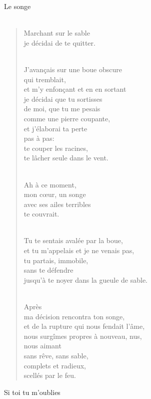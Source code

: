 \documentclass[11pt,a4paper]{book}
\begin{document}
\newpage

{\huge Le songe} \\ \\

\begin{verse}
Marchant sur le sable \\
je décidai de te quitter. \\ \

J'avan\c{c}ais sur une boue obscure \\
qui tremblait, \\
et m'y enfon\c{c}ant et en en sortant \\
je décidai que tu sortisses \\
de moi, que tu me pesais \\
comme une pierre coupante, \\
et j'élaborai ta perte \\
pas à pas: \\
te couper les racines, \\
te lâcher seule dans le vent. \\ \

Ah à ce moment, \\
mon c{\oe}ur, un songe \\
avec ses ailes terribles \\
te couvrait. \\ \

Tu te sentais avalée par la boue, \\
et tu m'appelais et je ne venais pas, \\
tu partais, immobile, \\
sans te défendre \\
jusqu'à te noyer dans la gueule de sable. \\ \

Après \\
ma décision rencontra ton songe, \\
et de la rupture qui nous fendait l'âme, \\
nous surgîmes propres à nouveau, nus, \\
nous aimant \\
sans rêve, sans sable, \\
complets et radieux, \\
scellés par le feu.
\end{verse}

\newpage

{\huge Si toi tu m'oublies} \\ \\
\end{document}
